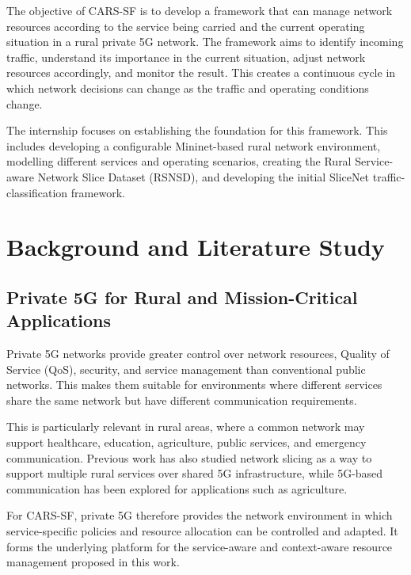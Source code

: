 \documentclass[12pt,a4paper]{report}
\begin{document}
The objective of CARS-SF is to develop a framework that can manage
network resources according to the service being carried and the current
operating situation in a rural private 5G network. The framework aims to
identify incoming traffic, understand its importance in the current
situation, adjust network resources accordingly, and monitor the result.
This creates a continuous cycle in which network decisions can change as
the traffic and operating conditions change.

The internship focuses on establishing the foundation for this framework.
This includes developing a configurable Mininet-based rural network
environment, modelling different services and operating scenarios,
creating the Rural Service-aware Network Slice Dataset (RSNSD), and
developing the initial SliceNet traffic-classification framework.
	
\chapter{Background and Literature Study}
\label{chap:background}
\section{Private 5G for Rural and Mission-Critical Applications}
\label{sec:private5g}

Private 5G networks provide greater control over network resources,
Quality of Service (QoS), security, and service management than
conventional public networks.
This makes them suitable for environments where different services
share the same network but have different communication requirements.

This is particularly relevant in rural areas, where a common network
may support healthcare, education, agriculture, public services, and
emergency communication. Previous work has also studied network
slicing as a way to support multiple rural services over shared 5G
infrastructure, while 5G-based communication
has been explored for applications such as agriculture.

For CARS-SF, private 5G therefore provides the network environment in
which service-specific policies and resource allocation can be
controlled and adapted. It forms the underlying platform for the
service-aware and context-aware resource management proposed in this
work.
	
\end{document}
